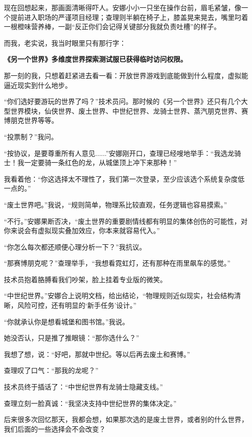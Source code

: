 现在回想起来，那画面清晰得吓人。安娜小小一只坐在操作台前，眉毛紧皱，像一个提前进入职场的严谨项目经理；查理则半躺在椅子上，膝盖晃来晃去，嘴里叼着一根橙味营养棒，一副“反正你们会记得关键部分我就负责吐槽”的样子。

而我，老实说，我当时眼里只有那行字：

\begin{center}
\textbf{《另一个世界》多维度世界探索测试服已获得临时访问权限。}
\end{center}

那一刻的我，只想着赶紧进去看一看：开放世界游戏到底能做到什么程度，虚拟能逼近现实到什么地步。

“你们选好要游玩的世界了吗？”技术员问。那时候的《另一个世界》还只有几个大型世界模块，仙侠世界、废土世界、中世纪世界、龙骑士世界、蒸汽朋克世界、赛博朋克世界等等。

“投票制？”我问。

“按协议，是要尊重所有人意见......”安娜刚开口，查理已经嗖地举手：“我选龙骑士！我一定要骑一条红色的龙，从城堡顶上冲下来那种！”

我看着他：“你这选择太不理性了，我们第一次登录，至少应该选个系统复杂度低一点的。”

“废土世界吧。”我说，“规则简单，物理系比较直观，任务逻辑也容易摸索。”

“不行。”安娜果断否决，“废土世界的重要剧情线都有明显的集体创伤的可能性，对你来说会有虚拟现实叠加效应，你本来就容易代入。”

“你怎么每次都还顺便心理分析一下？”我抗议。

“那赛博朋克呢？”查理举手，“我想看霓虹灯，还有那种在雨里飙车的感觉。”

技术员抱着胳膊看我们吵架，脸上挂着专业版的微笑。

“中世纪世界。”安娜合上说明文档，给出结论，“物理规则近似现实，社会结构清晰，风险可控，还有明显的‘新手任务’设计。”

“你就承认你是想看城堡和图书馆。”我说。

她没否认，只是推了推眼镜：“那你选什么？”

我想了想，说：“好吧，那就中世纪。等以后再去废土和赛博。”

查理叹了口气：“那我的龙呢？”

技术员终于插话了：“中世纪世界有龙骑士隐藏支线。”

查理立刻一脸真诚：“我坚决支持中世纪世界的集体决定。”

后来很多次回忆那天，我都会想，如果那次选的是废土世界，或者别的什么世界，我们后面的一些选择会不会改变？

